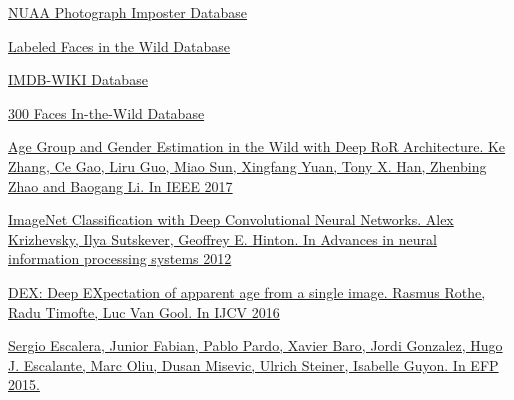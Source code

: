 \begin{thebibliography}{0}
    \hypertarget{NUAA}{}
    \href{http://parnec.nuaa.edu.cn/xtan/data/nuaaimposterdb.html}
    {NUAA Photograph Imposter Database}

    \hypertarget{lfw}{}
    \href{http://vis-www.cs.umass.edu/lfw/}
    {Labeled Faces in the Wild Database}

    \hypertarget{IMDB-WIKI}{}
    \href{https://data.vision.ee.ethz.ch/cvl/rrothe/imdb-wiki/}
    {IMDB-WIKI Database}

    \hypertarget{bug}{}
    \href{https://ibug.doc.ic.ac.uk/resources/300-W/}
    {300 Faces In-the-Wild Database}

    \hypertarget{DEEP}{}
    \href{https://arxiv.org/pdf/1710.02985.pdf}
    {Age Group and Gender Estimation in the Wild with Deep RoR Architecture.
    Ke Zhang, Ce Gao, Liru Guo, Miao Sun, Xingfang Yuan, Tony X. Han, Zhenbing Zhao and Baogang Li.
    In IEEE 2017
    }

    \hypertarget{LRN}{}
    \href{https://papers.nips.cc/paper/4824-imagenet-classification-with-deep-convolutional-neural-networks.pdf}
    {ImageNet Classification with Deep Convolutional Neural Networks.
    Alex Krizhevsky, Ilya Sutskever, Geoffrey E. Hinton.
    In Advances in neural information processing systems 2012
    }

    \hypertarget{imdb}{}
    \href{https://data.vision.ee.ethz.ch/cvl/publications/papers/proceedings/eth_biwi_01229.pdf}
    {DEX: Deep EXpectation of apparent age from a single image.
    Rasmus Rothe, Radu Timofte, Luc Van Gool.
    In IJCV 2016
    }

    \hypertarget{LAP}{}
    \href{http://refbase.cvc.uab.es/files/EFP2015.pdf}
    {
        Sergio Escalera, Junior Fabian, Pablo Pardo, Xavier Baro, Jordi Gonzalez, Hugo J. Escalante, Marc Oliu, Dusan Misevic, Ulrich Steiner, Isabelle Guyon.
        In EFP 2015.
    }
\end{thebibliography}